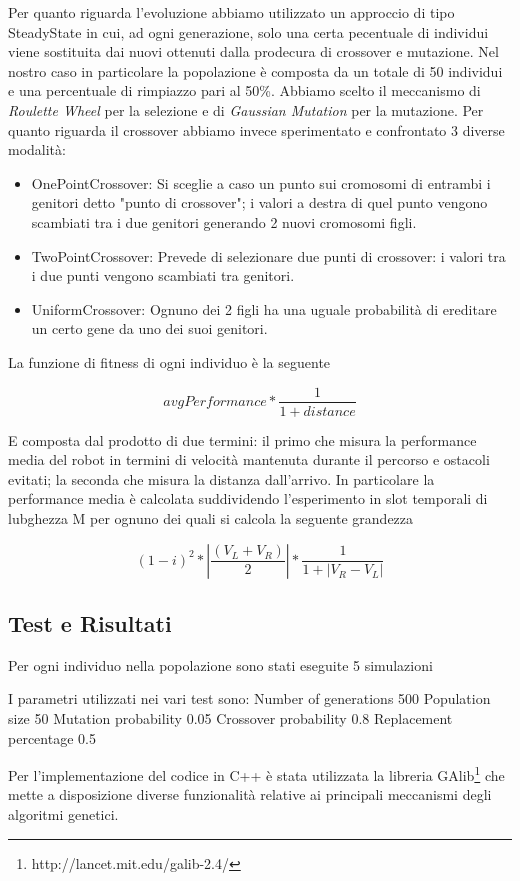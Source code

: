 \documentclass[]{report}
\begin{document}
Per quanto riguarda l'evoluzione abbiamo utilizzato un approccio di tipo SteadyState in cui, ad ogni generazione, solo una certa pecentuale di individui viene sostituita dai nuovi ottenuti dalla prodecura di crossover e mutazione. Nel nostro caso in particolare la popolazione è composta da un totale di 50 individui e una percentuale di rimpiazzo pari al 50\%.  Abbiamo scelto il meccanismo di \textit{Roulette Wheel} per la selezione e di \textit{Gaussian Mutation} per la mutazione.
Per quanto riguarda il crossover abbiamo invece sperimentato e confrontato 3 diverse modalità: 
\begin{itemize}
\item{OnePointCrossover}: Si sceglie a caso un punto sui cromosomi di entrambi i genitori detto "punto di crossover"; i valori a destra di quel punto vengono scambiati tra i due genitori generando 2 nuovi cromosomi figli.
\item{TwoPointCrossover}: Prevede di selezionare due punti di crossover: i valori tra i due punti vengono scambiati tra genitori.
\item{UniformCrossover}: Ognuno dei 2 figli ha una uguale probabilità di ereditare un certo gene da uno dei suoi genitori.
 \end{itemize}

La funzione di fitness di ogni individuo è la seguente

\[avgPerformance * \dfrac{1}{1+distance}\]

E composta dal prodotto di due termini: il primo che misura la performance media del robot in termini di velocità mantenuta durante il percorso e ostacoli evitati; la seconda che misura la distanza dall'arrivo. In particolare la performance media è calcolata suddividendo l'esperimento in slot temporali di lubghezza M per ognuno dei quali si calcola la seguente grandezza

\[(1-i)^2 * |\dfrac{(V_L+V_R)}{2}| * \dfrac{1}{1+|V_R-V_L|}\]

\subsection{Test e Risultati}

Per ogni individuo nella popolazione sono stati eseguite 5 simulazioni

I parametri utilizzati nei vari test sono:
Number of generations 500
Population size 50
Mutation probability 0.05
Crossover probability 0.8
Replacement percentage 0.5

Per l'implementazione del codice in C++ è stata utilizzata la libreria GAlib\footnote{http://lancet.mit.edu/galib-2.4/} che mette a disposizione diverse funzionalità relative ai principali meccanismi degli algoritmi genetici.






\end{document}
